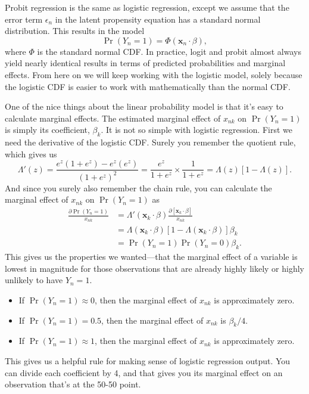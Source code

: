 \documentclass[
  12pt,
  oneside,openany]{book}
\begin{document}
Probit regression is the same as logistic regression, except we assume that the error term \(\epsilon_n\) in the latent propensity equation has a standard normal distribution.
This results in the model
\[
\Pr(Y_n = 1) = \Phi(\mathbf{x}_n \cdot \beta),
\]
where \(\Phi\) is the standard normal CDF.
In practice, logit and probit almost always yield nearly identical results in terms of predicted probabilities and marginal effects.
From here on we will keep working with the logistic model, solely because the logistic CDF is easier to work with mathematically than the normal CDF.

One of the nice things about the linear probability model is that it's easy to calculate marginal effects.
The estimated marginal effect of \(x_{nk}\) on \(\Pr(Y_n = 1)\) is simply its coefficient, \(\beta_k\).
It is not so simple with logistic regression.
First we need the derivative of the logistic CDF.
Surely you remember the quotient rule, which gives us
\[
\Lambda'(z)
= \frac{e^z (1 + e^z) - e^z (e^z)}{(1 + e^z)^2}
= \frac{e^z}{1 + e^z} \times \frac{1}{1 + e^z}
= \Lambda(z) [1 - \Lambda(z)].
\]
And since you surely also remember the chain rule, you can calculate the marginal effect of \(x_{nk}\) on \(\Pr(Y_n = 1)\) as
\[
\begin{aligned}
\frac{\partial \Pr(Y_n = 1)}{x_{nk}}
&= \Lambda'(\mathbf{x}_k \cdot \beta) \frac{\partial [\mathbf{x}_k \cdot \beta]}{x_{nk}} \\
&= \Lambda(\mathbf{x}_k \cdot \beta) [1 - \Lambda(\mathbf{x}_k \cdot \beta)] \beta_k \\
&= \Pr(Y_n = 1) \Pr(Y_n = 0) \beta_k.
\end{aligned}
\]
This gives us the properties we wanted---that the marginal effect of a variable is lowest in magnitude for those observations that are already highly likely or highly unlikely to have \(Y_n = 1\).

\begin{itemize}
\item
  If \(\Pr(Y_n = 1) \approx 0\), then the marginal effect of \(x_{nk}\) is approximately zero.
\item
  If \(\Pr(Y_n = 1) = 0.5\), then the marginal effect of \(x_{nk}\) is \(\beta_k / 4\).
\item
  If \(\Pr(Y_n = 1) \approx 1\), then the marginal effect of \(x_{nk}\) is approximately zero.
\end{itemize}

This gives us a helpful rule for making sense of logistic regression output.
You can divide each coefficient by 4, and that gives you its marginal effect on an observation that's at the 50-50 point.
\end{document}
